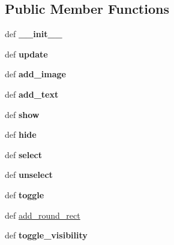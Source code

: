 \subsection*{Public Member Functions}
\begin{DoxyCompactItemize}
\item 
\hypertarget{classUI_1_1FuncButton_a3f6f4283b4e1554d630b56d96e541b39}{def {\bfseries \-\_\-\-\_\-init\-\_\-\-\_\-}}\label{classUI_1_1FuncButton_a3f6f4283b4e1554d630b56d96e541b39}

\item 
\hypertarget{classUI_1_1FuncButton_a9345b56143c32dd9c2a11702e6bb2d9d}{def {\bfseries update}}\label{classUI_1_1FuncButton_a9345b56143c32dd9c2a11702e6bb2d9d}

\item 
\hypertarget{classUI_1_1FuncButton_aa0c69d40a1d68697c26d0ae334195524}{def {\bfseries add\-\_\-image}}\label{classUI_1_1FuncButton_aa0c69d40a1d68697c26d0ae334195524}

\item 
\hypertarget{classUI_1_1FuncButton_a641ff94293aab411710ba32b004751b4}{def {\bfseries add\-\_\-text}}\label{classUI_1_1FuncButton_a641ff94293aab411710ba32b004751b4}

\item 
\hypertarget{classUI_1_1FuncButton_af2720dacd2a29801c59de1c7c6fdfef1}{def {\bfseries show}}\label{classUI_1_1FuncButton_af2720dacd2a29801c59de1c7c6fdfef1}

\item 
\hypertarget{classUI_1_1FuncButton_a231b4e611dca8ac4332a2b3d8bb3210c}{def {\bfseries hide}}\label{classUI_1_1FuncButton_a231b4e611dca8ac4332a2b3d8bb3210c}

\item 
\hypertarget{classUI_1_1FuncButton_a6a7130ef2ef43e2976340908cba9078a}{def {\bfseries select}}\label{classUI_1_1FuncButton_a6a7130ef2ef43e2976340908cba9078a}

\item 
\hypertarget{classUI_1_1FuncButton_a816b37385493022e881a1556167f0526}{def {\bfseries unselect}}\label{classUI_1_1FuncButton_a816b37385493022e881a1556167f0526}

\item 
\hypertarget{classUI_1_1FuncButton_a2bfabd86baeed2499d11f353f1b1773a}{def {\bfseries toggle}}\label{classUI_1_1FuncButton_a2bfabd86baeed2499d11f353f1b1773a}

\item 
def \hyperlink{classUI_1_1FuncButton_a3f6efb3f6f8db074ae90309365fe2383}{add\-\_\-round\-\_\-rect}
\item 
\hypertarget{classUI_1_1FuncButton_a92024aadbac1d083161e687e73a24ae3}{def {\bfseries toggle\-\_\-visibility}}\label{classUI_1_1FuncButton_a92024aadbac1d083161e687e73a24ae3}

\end{DoxyCompactItemize}
